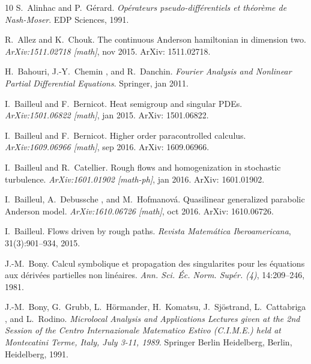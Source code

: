 \documentclass[11pt,reqno]{amsart}
\newcommand{\tmtextit}[1]{{\itshape{#1}}}
\begin{document}
\begin{thebibliography}{10}
  S.~Alinhac  and 
  P.~G{\'e}rard.{\newblock} \tmtextit{Op{\'e}rateurs pseudo-diff{\'e}rentiels
  et th{\'e}or{\`e}me de Nash-Moser}.{\newblock} EDP Sciences,
  1991.{\newblock}
  
  R.~Allez  and  K.~Chouk.{\newblock} The
  continuous Anderson hamiltonian in dimension two.{\newblock}
  \tmtextit{ArXiv:1511.02718 [math]}, nov 2015.{\newblock} ArXiv:
  1511.02718.{\newblock}
  
  H.~Bahouri, J.-Y.~Chemin , and 
  R.~Danchin.{\newblock} \tmtextit{Fourier Analysis and Nonlinear Partial
  Differential Equations}.{\newblock} Springer, jan 2011.{\newblock}
  
  I.~Bailleul  and  F.~Bernicot.{\newblock}
  Heat semigroup and singular PDEs.{\newblock} \tmtextit{ArXiv:1501.06822
  [math]}, jan 2015.{\newblock} ArXiv: 1501.06822.{\newblock}
  
  I.~Bailleul  and  F.~Bernicot.{\newblock}
  Higher order paracontrolled calculus.{\newblock} \tmtextit{ArXiv:1609.06966
  [math]}, sep 2016.{\newblock} ArXiv: 1609.06966.{\newblock}
  
  I.~Bailleul  and  R.~Catellier.{\newblock}
  Rough flows and homogenization in stochastic turbulence.{\newblock}
  \tmtextit{ArXiv:1601.01902 [math-ph]}, jan 2016.{\newblock} ArXiv:
  1601.01902.{\newblock}
  
  I.~Bailleul, A.~Debussche , and  M.~Hofmanov\'a.
  {\newblock} Quasilinear generalized parabolic Anderson
  model.{\newblock} \tmtextit{ArXiv:1610.06726 [math]}, oct 2016.{\newblock}
  ArXiv: 1610.06726.{\newblock}
  
  I.~Bailleul.{\newblock} Flows driven
  by rough paths.{\newblock} \tmtextit{Revista Matem{\'a}tica Iberoamericana},
  31(3):901--934, 2015.{\newblock}
  
  J.-M.~Bony.{\newblock} Calcul symbolique et propagation
  des singularites pour les {\'e}quations aux d{\'e}riv{\'e}es partielles non
  lin{\'e}aires.{\newblock} \tmtextit{Ann. Sci. {\'E}c. Norm. Sup{\'e}r. (4)},
  14:209--246, 1981.{\newblock}
  
  J.-M.~Bony, G.~Grubb, L.~H{\"o}rmander,
  H.~Komatsu, J.~Sj{\"o}strand, L.~Cattabriga , and  L.~Rodino.{\newblock}
  \tmtextit{Microlocal Analysis and Applications Lectures given at the 2nd
  Session of the Centro Internazionale Matematico Estivo (C.I.M.E.) held at
  Montecatini Terme, Italy, July 3-11, 1989}.{\newblock} Springer Berlin
  Heidelberg, Berlin, Heidelberg, 1991.{\newblock}
  

\end{thebibliography}
\end{document}
